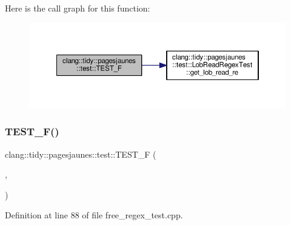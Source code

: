 Here is the call graph for this function\+:
\nopagebreak
\begin{figure}[H]
\begin{center}
\leavevmode
\includegraphics[width=350pt]{namespaceclang_1_1tidy_1_1pagesjaunes_1_1test_add145896a766ab2e9a31ae812408d30c_cgraph}
\end{center}
\end{figure}
\mbox{\label{namespaceclang_1_1tidy_1_1pagesjaunes_1_1test_a34c90a906bf999b3505c0b11192c6294}} 
\subsubsection{\texorpdfstring{T\+E\+S\+T\+\_\+\+F()}{TEST\_F()}\hspace{0.1cm}{\footnotesize\ttfamily [23/57]}}
{\footnotesize\ttfamily clang\+::tidy\+::pagesjaunes\+::test\+::\+T\+E\+S\+T\+\_\+F (\begin{DoxyParamCaption}\item[{\hyperlink{classclang_1_1tidy_1_1pagesjaunes_1_1test_1_1_free_regex_test}{Free\+Regex\+Test}}]{,  }\item[{Regex\+Matching\+Weird\+Syntax}]{ }\end{DoxyParamCaption})}



Definition at line 88 of file free\+\_\+regex\+\_\+test.\+cpp.

